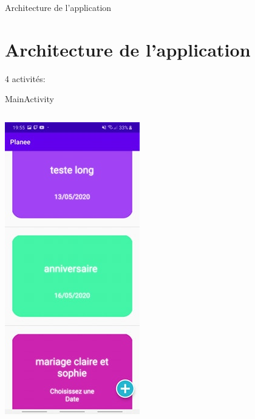 \documentclass[11pt]{beamer}
\begin{document}
\begin{frame}{Architecture de l'application}
\section{Architecture de l'application}
4 activités: 
\begin{itemize}
\end{itemize}
\end{frame}

\begin{frame}{MainActivity}
\begin{columns}
\includegraphics[scale=0.4]{HomeWEvents1}


\end{columns}
\end{frame}
\end{document}
